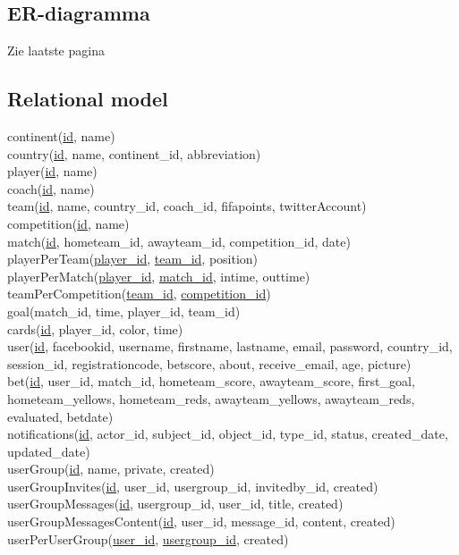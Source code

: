 \documentclass[11pt, a4paper]{article}
\begin{document}
\begin{enumerate}
\end{enumerate}

\subsection{ER-diagramma}
Zie laatste pagina
\subsection{Relational model}
continent(\uline{id}, name) \\
country(\uline{id}, name, continent\_id, abbreviation) \\
player(\uline{id}, name) \\
coach(\uline{id}, name) \\
team(\uline{id}, name, country\_id, coach\_id, fifapoints, twitterAccount) \\
competition(\uline{id}, name) \\
match(\uline{id}, hometeam\_id, awayteam\_id, competition\_id, date) \\
playerPerTeam(\uline{player\_id}, \uline{team\_id}, position) \\
playerPerMatch(\uline{player\_id}, \uline{match\_id}, intime, outtime) \\
teamPerCompetition(\uline{team\_id}, \uline{competition\_id}) \\
goal(match\_id, time, player\_id, team\_id) \\
cards(\uline{id}, player\_id, color, time) \\
user(\uline{id}, facebookid, username, firstname, lastname, email, password, country\_id, session\_id, registrationcode, betscore, about, receive\_email, age, picture) \\
bet(\uline{id}, user\_id, match\_id, hometeam\_score, awayteam\_score, first\_goal, hometeam\_yellows, hometeam\_reds, awayteam\_yellows, awayteam\_reds, evaluated, betdate) \\
notifications(\uline{id}, actor\_id, subject\_id, object\_id, type\_id, status, created\_date, updated\_date) \\
userGroup(\uline{id}, name, private, created) \\
userGroupInvites(\uline{id}, user\_id, usergroup\_id, invitedby\_id, created) \\
userGroupMessages(\uline{id}, usergroup\_id, user\_id, title, created) \\
userGroupMessagesContent(\uline{id}, user\_id, message\_id, content, created) \\
userPerUserGroup(\uline{user\_id}, \uline{usergroup\_id}, created)\\
\end{document}

